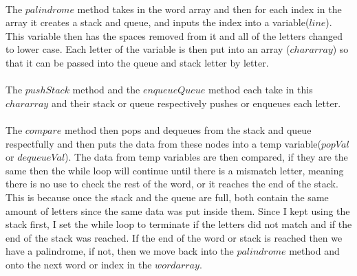 \documentclass[letterpaper, 10pt,DIV=13]{scrartcl}
\numberwithin{equation}{section} %
\numberwithin{figure}{section} %
\numberwithin{table}{section} %
\begin{document}
\paragraph{} The $palindrome$ method takes in the word array and then for each index in the array it creates a stack and queue, and inputs the index into a variable($line$). This variable then has the spaces removed from it and all of the letters changed to lower case. Each letter of the variable is then put into an array ($chararray$) so that it can be passed into the queue and stack letter by letter. 
\paragraph{} The $pushStack$ method and the $enqueueQueue$ method each take in this $chararray$ and their stack or queue respectively pushes or enqueues each letter. 
\paragraph{} The $compare$ method then pops and dequeues from the stack and queue respectfully and then puts the data from these nodes into a temp variable($popVal$ or $dequeueVal$). The data from temp variables are then compared, if they are the same then the while loop will continue until there is a mismatch letter, meaning there is no use to check the rest of the word, or it reaches the end of the stack. This is because once the stack and the queue are full, both contain the same amount of letters since the same data was put inside them. Since I kept using the stack first, I set the while loop to terminate if the letters did not match and if the end of the stack was reached. If the end of the word or stack is reached then we have a palindrome, if not, then we move back into the $palindrome$ method and onto the next word or index in the $wordarray$.


 

\pagebreak
\end{document}
